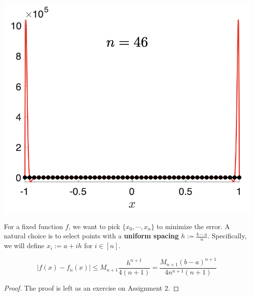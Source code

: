 \begin{marginfigure}
\begin{center}
        \includegraphics[width=\textwidth]{figures/fig-15.png}
    \end{center}
\end{marginfigure}

\noindent For a fixed function $f$, we want to pick $\{x_0, \cdots, x_n\}$ to minimize the error. A natural choice is to select points with a \textbf{uniform spacing} $h := \frac{b-a}{n}$. Specifically, we will define $x_i := a + ih$ for $i \in [n]$. 

\begin{thm}
    \[\left|f(x)-f_n(x)\right| \leq M_{n+1} \frac{h^{n+1}}{4(n+1)}=\frac{M_{n+1}(b-a)^{n+1}}{4 n^{n+1}(n+1)}\]
\end{thm}

\begin{proof}
    The proof is left as an exercise on Assignment 2.
\end{proof}

